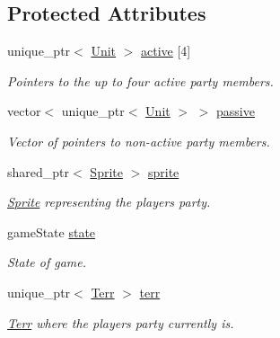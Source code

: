 \subsection*{Protected Attributes}
\begin{DoxyCompactItemize}
\item 
unique\+\_\+ptr$<$ \hyperlink{class_unit}{Unit} $>$ \hyperlink{class_party_aec6e42afb906b261b4d367922a1c0d33}{active} \mbox{[}4\mbox{]}\hypertarget{class_party_aec6e42afb906b261b4d367922a1c0d33}{}\label{class_party_aec6e42afb906b261b4d367922a1c0d33}

\begin{DoxyCompactList}\small\item\em Pointers to the up to four active party members. \end{DoxyCompactList}\item 
vector$<$ unique\+\_\+ptr$<$ \hyperlink{class_unit}{Unit} $>$ $>$ \hyperlink{class_party_a6dd68ad949efb33afd401d26de7ba2a4}{passive}\hypertarget{class_party_a6dd68ad949efb33afd401d26de7ba2a4}{}\label{class_party_a6dd68ad949efb33afd401d26de7ba2a4}

\begin{DoxyCompactList}\small\item\em Vector of pointers to non-\/active party members. \end{DoxyCompactList}\item 
shared\+\_\+ptr$<$ \hyperlink{class_sprite}{Sprite} $>$ \hyperlink{class_party_ae063baa6bfa6fe247ade34a135eb3552}{sprite}\hypertarget{class_party_ae063baa6bfa6fe247ade34a135eb3552}{}\label{class_party_ae063baa6bfa6fe247ade34a135eb3552}

\begin{DoxyCompactList}\small\item\em \hyperlink{class_sprite}{Sprite} representing the player\textquotesingle{}s party. \end{DoxyCompactList}\item 
game\+State \hyperlink{class_party_af307661a756afaad6a61efc1f2173feb}{state}\hypertarget{class_party_af307661a756afaad6a61efc1f2173feb}{}\label{class_party_af307661a756afaad6a61efc1f2173feb}

\begin{DoxyCompactList}\small\item\em State of game. \end{DoxyCompactList}\item 
unique\+\_\+ptr$<$ \hyperlink{class_terr}{Terr} $>$ \hyperlink{class_party_a50fdc449d05dd04c217ebb380e98a955}{terr}\hypertarget{class_party_a50fdc449d05dd04c217ebb380e98a955}{}\label{class_party_a50fdc449d05dd04c217ebb380e98a955}

\begin{DoxyCompactList}\small\item\em \hyperlink{class_terr}{Terr} where the player\textquotesingle{}s party currently is. \end{DoxyCompactList}\end{DoxyCompactItemize}


